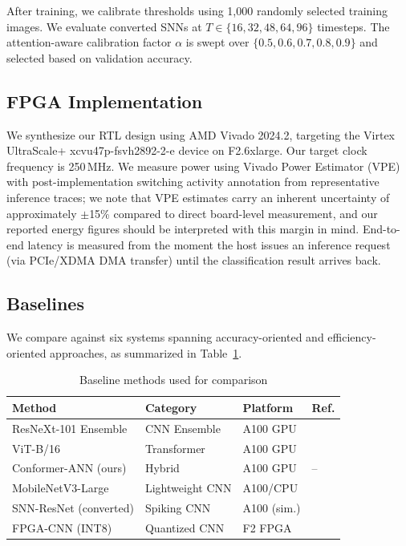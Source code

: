 \documentclass[11pt,a4paper]{article}
\begin{document}
After training, we calibrate thresholds using 1,000 randomly selected training images. We evaluate converted SNNs at $T \in \{16, 32, 48, 64, 96\}$ timesteps. The attention-aware calibration factor $\alpha$ is swept over $\{0.5, 0.6, 0.7, 0.8, 0.9\}$ and selected based on validation accuracy.

\subsection{FPGA Implementation}

We synthesize our RTL design using AMD Vivado 2024.2, targeting the Virtex UltraScale+ xcvu47p-fsvh2892-2-e device on F2.6xlarge. Our target clock frequency is 250\,MHz. We measure power using Vivado Power Estimator (VPE) with post-implementation switching activity annotation from representative inference traces; we note that VPE estimates carry an inherent uncertainty of approximately $\pm$15\% compared to direct board-level measurement, and our reported energy figures should be interpreted with this margin in mind. End-to-end latency is measured from the moment the host issues an inference request (via PCIe/XDMA DMA transfer) until the classification result arrives back.

\subsection{Baselines}

We compare against six systems spanning accuracy-oriented and efficiency-oriented approaches, as summarized in Table~\ref{tab:baselines}.

\begin{table}[H]
\centering
\caption{Baseline methods used for comparison}
\label{tab:baselines}
\begin{tabular}{@{}llll@{}}
\toprule
\textbf{Method} & \textbf{Category} & \textbf{Platform} & \textbf{Ref.} \\
\midrule
ResNeXt-101 Ensemble & CNN Ensemble & A100 GPU & \cite{alshazly2020deep} \\
ViT-B/16 & Transformer & A100 GPU & \cite{dosovitskiy2021image} \\
Conformer-ANN (ours) & Hybrid & A100 GPU & -- \\
MobileNetV3-Large & Lightweight CNN & A100/CPU & \cite{howard2019searching} \\
SNN-ResNet (converted) & Spiking CNN & A100 (sim.) & \cite{li2021free} \\
FPGA-CNN (INT8) & Quantized CNN & F2 FPGA & \cite{zhang2020fpga} \\
\bottomrule
\end{tabular}
\end{table}
\end{document}
